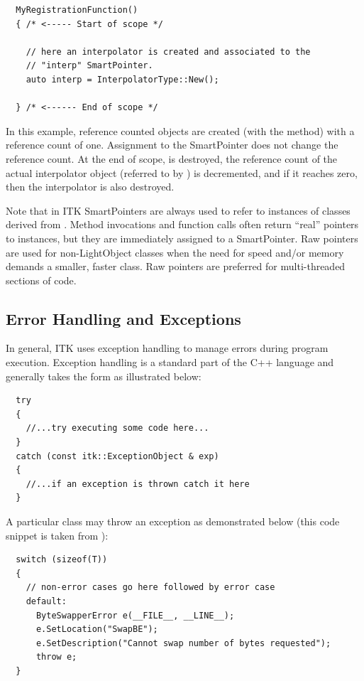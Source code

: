 \small
\begin{verbatim}
  MyRegistrationFunction()
  { /* <----- Start of scope */

    // here an interpolator is created and associated to the
    // "interp" SmartPointer.
    auto interp = InterpolatorType::New();

  } /* <------ End of scope */
\end{verbatim}
\normalsize

In this example, reference counted objects are created (with the 
method) with a reference count of one. Assignment to the SmartPointer
 does not change the reference count. At the end of scope,
 is destroyed, the reference count of the actual interpolator
object (referred to by ) is decremented, and if it reaches zero,
then the interpolator is also destroyed.

Note that in ITK SmartPointers are always used to refer to instances of
classes derived from . Method invocations and function
calls often return ``real'' pointers to instances, but they are immediately
assigned to a SmartPointer. Raw pointers are used for non-LightObject classes when
the need for speed and/or memory demands a smaller, faster class. Raw pointers
are preferred for multi-threaded sections of code.


\subsection{Error Handling and Exceptions}%
\label{sec:ErrorHandling}%
%

In general, ITK uses exception handling to manage errors during program
execution. Exception handling is a standard part of the C++ language and
generally takes the form as illustrated below:

\small
\begin{verbatim}
  try
  {
    //...try executing some code here...
  }
  catch (const itk::ExceptionObject & exp)
  {
    //...if an exception is thrown catch it here
  }
\end{verbatim}
\normalsize

A particular class may throw an exception as demonstrated below
(this code snippet is taken from ):

\small
\begin{verbatim}
  switch (sizeof(T))
  {
    // non-error cases go here followed by error case
    default:
      ByteSwapperError e(__FILE__, __LINE__);
      e.SetLocation("SwapBE");
      e.SetDescription("Cannot swap number of bytes requested");
      throw e;
  }
\end{verbatim}
\normalsize

